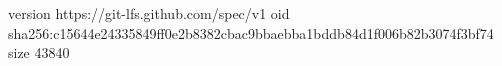 version https://git-lfs.github.com/spec/v1
oid sha256:c15644e24335849ff0e2b8382cbac9bbaebba1bddb84d1f006b82b3074f3bf74
size 43840
